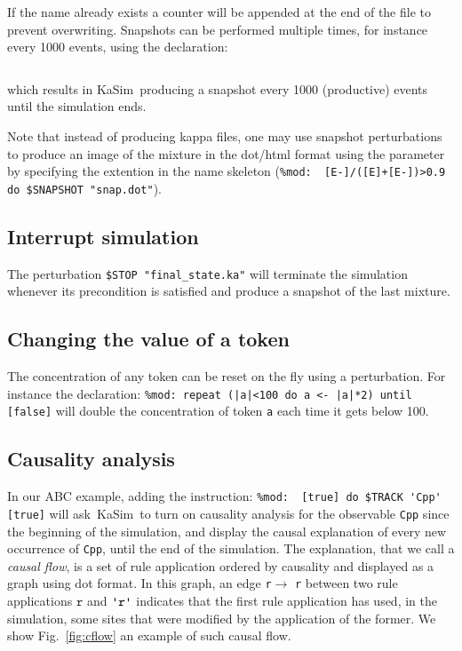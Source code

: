 \documentclass[11pt]{book}
\def\KaSim{\textsf{KaSim}}
\def\ttt#1{\texttt{#1}}
\def\noi{\noindent}
\begin{document}
If the name already exists a counter will be appended at the end of
the file to prevent overwriting. Snapshots can be performed multiple
times, for instance every 1000 events, using the
declaration:
\begin{lstlisting}[language=kappa]
%mod: repeat ([E] [mod] 1000)=0 do $SNAPSHOT "abc.ka" until [false]
\end{lstlisting}
which results in \KaSim~producing a snapshot every 1000 (productive) events until the simulation ends.

Note that instead of producing kappa files, one may use snapshot perturbations to produce an image of the mixture in the dot/html format using the parameter by specifying the extention in the name skeleton (\lstinline[language=kappa]!%mod:  [E-]/([E]+[E-])>0.9 do $SNAPSHOT "snap.dot"!).

\subsection{Interrupt simulation}
The perturbation \ttt{\$STOP "final\_state.ka"} will terminate the
simulation whenever its precondition is satisfied and produce a
snapshot of the last mixture.

\subsection{Changing the value of a token}
The concentration of any token can be reset on the fly using a perturbation. For instance the declaration:
\lstinline[language=kappa]!%mod: repeat (|a|<100 do a <- |a|*2) until [false]!
will double the concentration of token \ttt{a} each time it gets below 100.

\subsection{Causality analysis}\label{sec:cflows}

In our ABC example, adding the instruction:
\lstinline[language=kappa]!%mod:  [true] do $TRACK 'Cpp' [true]!
\noi will ask~\KaSim~to turn on causality analysis for the observable \ttt{{\textquotesingle}Cpp{\textquotesingle}} since the beginning of the simulation, and display the causal explanation of every new occurrence of \ttt{{\textquotesingle}Cpp{\textquotesingle}}, until the end of the simulation. The explanation, that we call a \emph{causal flow}, is a set of rule application ordered by causality and displayed as a graph using dot format. In this graph, an edge \ttt{r}$\longrightarrow$ \ttt{r{\textquotesingle}} between two rule applications $\ttt{r}$ and $\ttt{{\textquotesingle}r{\textquotesingle}}$ indicates that the first rule application has used, in the simulation, some sites that were modified by the application of the former. We show Fig.~\ref{fig:cflow} an example of such causal flow.
\end{document}
